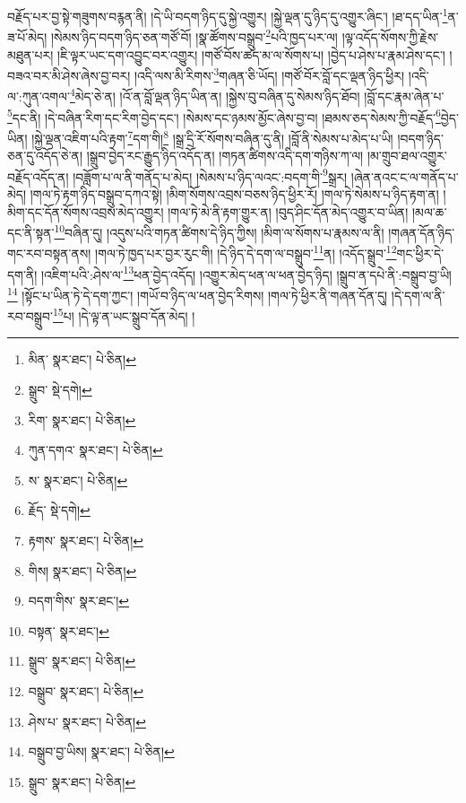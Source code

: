 བརྗོད་པར་བྱ་སྟེ་གཟུགས་བརྙན་ནི། །དེ་ཡི་བདག་ཉིད་དུ་སྐྱེ་འགྱུར། །སྐྱེ་ལྡན་དུ་ཉིད་དུ་འགྱུར་ཞིང་། །ཐ་དད་ཡིན་\footnote{མིན་  སྣར་ཐང་།  པེ་ཅིན། }ན་ཟ་པོ་མེད། །སེམས་ཉིད་བདག་ཉིད་ཅན་གཙོ་བོ། །སྣ་ཚོགས་བསྒྲུབ་\footnote{སྒྲུབ་  སྡེ་དགེ། }པའི་ཁྱད་པར་ལ། །ལྟ་འདོད་སོགས་ཀྱི་རྗེས་མཐུན་པར། །ཇི་ལྟར་ཡང་དག་འབྱུང་བར་འགྱུར། །གཙོ་བོས་ཚད་མ་ལ་སོགས་པ། །བྱེད་པ་ཤེས་པ་རྣམ་ཤེས་དང་། །བཟའ་བར་མི་ཤེས་ཞེས་བྱ་བར། །འདི་ལས་མི་རིགས་\footnote{རིག་  སྣར་ཐང་།  པེ་ཅིན། }གཞན་ཅི་ཡོད། །གཙོ་བོར་བློ་དང་ལྡན་ཉིད་ཕྱིར། །འདི་ལ་:ཀུན་འགལ་\footnote{ཀུན་དགའ་  སྣར་ཐང་།  པེ་ཅིན། }མེད་ཅེ་ན། །འོ་ན་བློ་ལྡན་ཉིད་ཡིན་ན། །སྐྱེས་བུ་བཞིན་དུ་སེམས་ཉིད་ཐོབ། །བློ་དང་རྣམ་ཞེན་པ་\footnote{ས་  སྣར་ཐང་།  པེ་ཅིན། }དང་ནི། །དེ་བཞིན་རིག་དང་རིག་བྱེད་དང་། །སེམས་དང་ཉམས་མྱོང་ཞེས་བྱ་བ། །ཐམས་ཅད་སེམས་ཀྱི་བརྗོད་\footnote{རྗོད་  སྡེ་དགེ། }བྱེད་ཡིན། །སྐྱེ་ལྡན་འཇིག་པའི་རྟག་\footnote{རྟགས་  སྣར་ཐང་།  པེ་ཅིན། }དག་གི།\footnote{གིས།  སྣར་ཐང་།  པེ་ཅིན། } །སྒྲ་དྲི་རོ་སོགས་བཞིན་དུ་ནི། །བློ་ནི་སེམས་པ་མེད་པ་ཡི། །བདག་ཉིད་ཅན་དུ་འདོད་ཅེ་ན། །སྒྲུབ་བྱེད་རང་རྒྱུད་ཉིད་འདོད་ན། །གཏན་ཚིགས་འདི་དག་གཉིས་ཀ་ལ། །མ་གྲུབ་ཐལ་འགྱུར་བརྗོད་འདོད་ན། །བཟློག་པ་ལ་ནི་གནོད་པ་མེད། །སེམས་པ་ཉིད་ལའང་:བདག་གི་\footnote{བདག་གིས་  སྣར་ཐང་། }སྒྲར། །ཞེན་ནའང་ང་ལ་གནོད་པ་མེད། །གལ་ཏེ་རྟག་ཉིད་བསྒྲུབ་དཀའ་སྟེ། །མིག་སོགས་འབྲས་བཅས་ཉིད་ཕྱིར་རོ། །གལ་ཏེ་སེམས་པ་ཉིད་རྟག་ན། །མིག་དང་དོན་སོགས་འབྲས་མེད་འགྱུར། །གལ་ཏེ་མེ་ནི་རྟག་གྱུར་ན། །བུད་ཤིང་དོན་མེད་འགྱུར་བ་ཡིན། །མལ་ཆ་དང་ནི་སྟན་\footnote{བསྟན་  སྣར་ཐང་། }བཞིན་དུ། །འདུས་པའི་གཏན་ཚིགས་དེ་ཉིད་ཀྱིས། །མིག་ལ་སོགས་པ་རྣམས་ལ་ནི། །གཞན་དོན་ཉིད་གང་རབ་བསྟན་ནས། །གལ་ཏེ་ཁྱད་པར་བྱར་རུང་གི། །དེ་ཉིད་དེ་དག་ལ་བསྒྲུབ་\footnote{སྒྲུབ་  སྣར་ཐང་།  པེ་ཅིན། }ན། །འདོད་སྒྲུབ་\footnote{བསྒྲུབ་  སྣར་ཐང་།  པེ་ཅིན། }གང་ཕྱིར་དེ་དག་ནི། །འཇིག་པའི་:ཤེས་ལ་\footnote{ཤེས་པ་  སྣར་ཐང་།  པེ་ཅིན། }ཕན་བྱེད་འདོད། །འགྱུར་མེད་ཕན་ལ་ཕན་བྱེད་ཉིད། །སྒྲུབ་ན་དཔེ་ནི་:བསྒྲུབ་བྱ་ཡི།\footnote{བསྒྲུབ་བྱ་ཡིས།  སྣར་ཐང་།  པེ་ཅིན། } །སྟོང་པ་ཡིན་ཏེ་དེ་དག་ཀྱང་། །གཡོ་བ་ཉིད་ལ་ཕན་བྱེད་རིགས། །གལ་ཏེ་ཕྱིར་ནི་གཞན་དོན་དུ། །དེ་དག་ལ་ནི་རབ་བསྒྲུབ་\footnote{སྒྲུབ་  སྣར་ཐང་།  པེ་ཅིན། }པ། །དེ་ལྟ་ན་ཡང་སྒྲུབ་དོན་མེད། །
